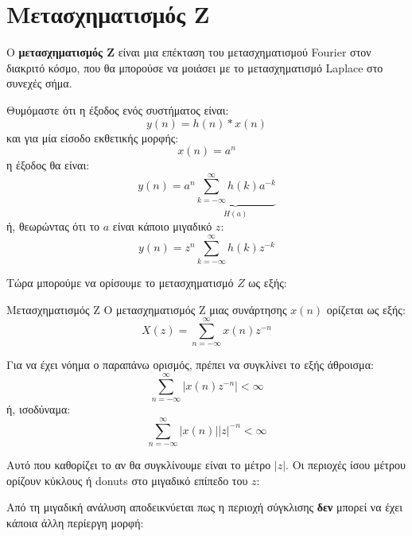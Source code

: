 \documentclass[11pt,a4paper,notitlepage,fleqn]{article}
\begin{document}
\section{Μετασχηματισμός Z}
Ο \textbf{μετασχηματισμός Z} είναι μια επέκταση του μετασχηματισμού Fourier στον διακριτό κόσμο, που
θα μπορούσε να μοιάσει με το μετασχηματισμό Laplace στο συνεχές σήμα.

Θυμόμαστε ότι η έξοδος ενός συστήματος είναι:
\[
y(n) = h(n) * x(n)
\]
και για μία είσοδο εκθετικής μορφής:
\[
x(n) =a^n
\]
η έξοδος θα είναι:
\[
y(n) = a^n \underbrace{\sum_{k=-\infty}^{\infty} h(k)a^{-k}}_{H(a)}
\]
ή, θεωρώντας ότι το \( a \) είναι κάποιο μιγαδικό \( z \):
\[
y(n) = z^n \sum_{k=-\infty}^{\infty} h(k)z^{-k}
\]

Τώρα μπορούμε να ορίσουμε το μετασχηματισμό \( Z \) ως εξής:
\begin{defn}{Μετασχηματισμός Z}{}
	Ο μετασχηματισμός Z μιας συνάρτησης \( x(n) \) ορίζεται ως εξής:
	\[
	X(z) = \sum_{n=-\infty}^{\infty} x(n) z^{-n}
	\]
\end{defn}

Για να έχει νόημα ο παραπάνω ορισμός, πρέπει να συγκλίνει το εξής άθροισμα:
\[
\sum_{n=-\infty}^{\infty} \left| x(n)z^{-n} \right| < \infty
\]
ή, ισοδύναμα:
\[
\sum_{n=-\infty}^{\infty} \left\lvert x(n) \right\rvert \left\lvert z\right\rvert^{-n} < \infty
\]

Αυτό που καθορίζει το αν θα συγκλίνουμε είναι το μέτρο \( |z| \). Οι περιοχές ίσου μέτρου ορίζουν
κύκλους ή donuts στο μιγαδικό επίπεδο του \( z \):

\hfill
{}
\hfill
{}

Από τη μιγαδική ανάλυση αποδεικνύεται πως η περιοχή σύγκλισης \textbf{δεν} μπορεί να έχει κάποια άλλη περίεργη
μορφή:
\end{document}
